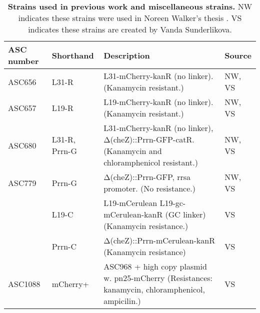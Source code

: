 \begin{table}[h]
    \begin{tabularx}{\textwidth}{llXl}
        \textbf{ASC number}	& \textbf{Shorthand} & \textbf{Description} & \textbf{Source}		\\
        \hline
        ASC656	& L31-R & L31-mCherry-kanR (no linker).	(Kanamycin resistant.) & NW, VS \\
        ASC657	& L19-R & L19-mCherry-kanR (no linker).	(Kanamycin resistant.) & NW, VS \\
        ASC680	& L31-R, Prrn-G & L31-mCherry-kanR (no linker), Δ(cheZ)::Prrn-GFP-catR. (Kanamycin and chloramphenicol resistant.)	& NW, VS \\
        ASC779	& Prrn-G& Δ(cheZ)::Prrn-GFP, rrsa promoter. (No resistance.) &	NW, VS \\
        
        \hline										
        & L19-C & 	L19-mCerulean L19-gc-mCerulean-kanR (GC linker)	(Kanamycin resistance.)	& VS \\
        & Prrn-C & 	Δ(cheZ)::Prrn-mCerulean-kanR	(Kanamycin resistance)	& VS \\
        \hline
        ASC1088 & mCherry+
        &	ASC968 + high copy plasmid w. pn25-mCherry (Resistances: kanamycin, chloramphenicol, ampicilin.) & VS \\
        \hline
    \end{tabularx}
    \caption{\textbf{Strains used in previous work and miscellaneous strains.} NW indicates these strains were used in Noreen Walker's thesis \cite{Walker2016t}. VS indicates these strains are created by Vanda Sunderlikova.}
    \label{table:ribo:strains2}
\end{table}




